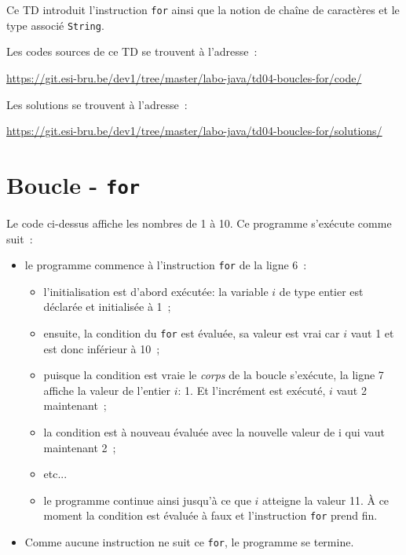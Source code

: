 \documentclass[a4paper,11pt]{article}
\date{2018 -- 2019}
\newcommand{\publicbasepath}{https://git.esi-bru.be/dev1/tree/master/labo-java/td04-boucles-for}
\newcommand{\solutionspublicpath}{\publicbasepath/solutions/}
\renewcommand{\listingpublicpath}{\publicbasepath/code/}
\begin{document}
\entete
\titre
{}
\lastedit


	Ce TD introduit l'instruction \texttt{for} ainsi que la notion de chaîne de caractères et le type
	associé \texttt{String}.
	
	Les codes sources de ce TD se trouvent à l'adresse~: 
	
	\url{\listingpublicpath}
	
	Les solutions se trouvent à l'adresse~:
	
	\url{\solutionspublicpath}

	 
	\tableofcontents

	\newpage

\section{Boucle - \texttt{for}}

	Le code ci-dessus affiche les nombres de 1 à 10.
	Ce programme s'exécute comme suit~:
	\begin{itemize}
		\item  le programme commence à l'instruction \texttt{for} de la ligne 6~:
			\begin{itemize}
				\item l'initialisation  est d'abord exécutée: 
					la variable $i$ de type entier est déclarée et initialisée à 1~;
				\item  ensuite, la condition du \texttt{for} 
					est évaluée, sa valeur est vrai car $i$ vaut 1 et est donc inférieur à 10~;
				\item puisque la condition est vraie le \emph{corps} de la boucle s'exécute, 
					la ligne 7 affiche la valeur de l'entier $i$: 1. 
					Et l'incrément  est exécuté, $i$ vaut 2 maintenant~;
				\item la condition est à nouveau évaluée avec la nouvelle valeur de i qui vaut maintenant 2~;
				\item etc...
				\item le programme continue ainsi jusqu'à ce que $i$ atteigne la valeur 11. 
					\`A ce moment la condition est évaluée à faux et l'instruction 
					\texttt{for} prend fin.
			\end{itemize}
		\item	Comme aucune instruction ne suit ce \texttt{for}, le programme se termine.

	\end{itemize}
\end{document}
